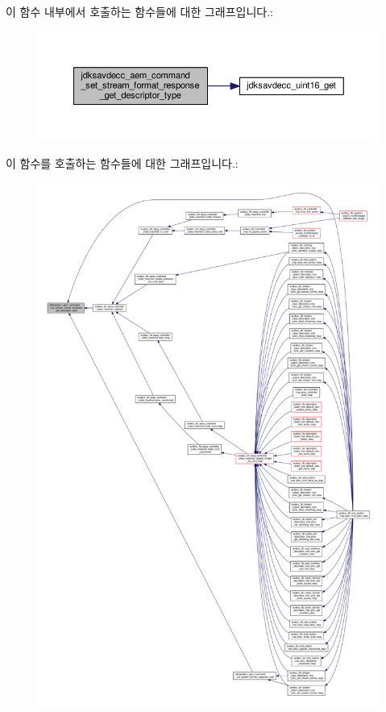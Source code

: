 이 함수 내부에서 호출하는 함수들에 대한 그래프입니다.\+:
\nopagebreak
\begin{figure}[H]
\begin{center}
\leavevmode
\includegraphics[width=350pt]{group__command__set__stream__format__response_ga236db9fb302ab75ca2403531040254c8_cgraph}
\end{center}
\end{figure}




이 함수를 호출하는 함수들에 대한 그래프입니다.\+:
\nopagebreak
\begin{figure}[H]
\begin{center}
\leavevmode
\includegraphics[width=350pt]{group__command__set__stream__format__response_ga236db9fb302ab75ca2403531040254c8_icgraph}
\end{center}
\end{figure}


